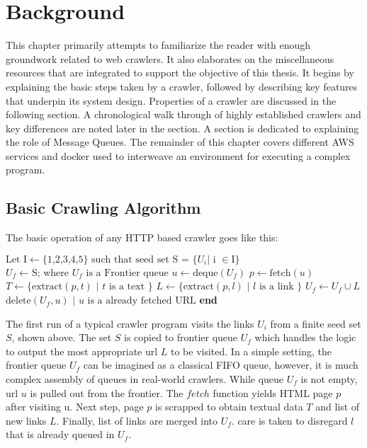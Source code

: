 \chapter{Background}
This chapter primarily attempts to familiarize the reader with enough groundwork related to web crawlers. It
also elaborates on the miscellaneous resources that are integrated to support the objective of this thesis.
It begins by explaining the basic steps taken by a crawler, followed by describing key features that
underpin its system design. Properties of a crawler are discussed in the following section. A
chronological walk through of highly established crawlers and key differences are noted later in the
section. A section is dedicated to explaining the role of Message Queues. The remainder of this chapter covers
different AWS services and docker used to interweave an environment for executing a complex program.


\section{Basic Crawling Algorithm}\label{basicalgo}
The basic operation of any HTTP based crawler goes like this:
\begin{algorithm}
\begin{algorithmic}[1]
  \State $\text{Let I} \gets \text{\{1,2,3,4,5\}} \text{ such that seed set S = \{} U_i \text{| i } \in \text{I\}}$
  \State $U_f \gets \text{S; where } U_f \text{ is a Frontier queue}$
    \State $u \gets \text{deque}(U_f)$ 
    \State $p \gets \text{fetch}(u)$
    \State $T \gets \text{\{extract}(p, t) \text{ | } t \text{ is a text \}}$
    \State $L \gets \text{\{extract}(p, l) \text{ | } l \text{ is a link \}}$
    \State $U_f \gets U_f \cup L$
    \State $\text{delete}(U_f, u) \text{ | } u \text{ is a already fetched URL}$
  \EndWhile
\EndProcedure
\State \textbf{end}
\end{algorithmic}
\end{algorithm}

\noindent
The first run of a typical crawler program visits the links $U_i$ from a finite seed set $S$, shown above. 
The set $S$ is copied to frontier queue $U_f$ which handles the logic to output the most appropriate url $L$ to be visited. In a simple setting, the frontier queue $U_f$ can be imagined as a classical FIFO queue,
however, it is much complex assembly of queues in real-world crawlers. While queue $U_f$ is not empty, url $u$ is pulled out from the frontier. The $fetch$ function yields HTML page $p$ after visiting u. Next step,
page $p$ is scrapped to obtain textual data $T$ and list of new links $L$. Finally, list of links are merged into $U_f$. care is taken to disregard $l$ that is already queued in $U_f$.

